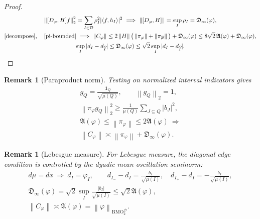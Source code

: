 \documentclass[11pt]{amsart}
\newtheorem{remark}[theorem]{Remark}
\newcommand{\D}{\mathcal D}
\newcommand{\ip}[2]{\langle #1,#2\rangle}
\newcommand{\norm}[1]{\left\|#1\right\|}
\begin{document}
\begin{proof}
\begin{gather*}
 \norm{[D_\varphi,H]f}_2^2
       =\sum_{I\in\D}\rho_I^2|\ip{f}{h_I}|^2
 \ \Longrightarrow\
 \norm{[D_\varphi,H]}=\sup_I\rho_I=\mathfrak D_\infty(\varphi),\\
 \eqref{decompose},\quad\eqref{pi-bounded}
 \ \Longrightarrow\
 \norm{C_\varphi}
  \le2\norm H\big(\norm{\pi_\varphi}+\norm{\pi_{\overline\varphi}}\big)
                       +\mathfrak D_\infty(\varphi)
  \le8\sqrt2\,\mathfrak A(\varphi)+\mathfrak D_\infty(\varphi),\\
 \sup_I|d_I-d_{\widehat I}|\le\mathfrak D_\infty(\varphi)
                    \le\sqrt2\sup_I|d_I-d_{\widehat I}|.
\end{gather*}
\end{proof}

\begin{remark}[Paraproduct norm]
Testing on normalized interval indicators gives
\begin{gather*}
 g_Q=\frac{\mathbf1_Q}{\sqrt{\mu(Q)}},\qquad\norm{g_Q}_2=1,\\
 \norm{\pi_\varphi g_Q}_2^2
       \ge\frac1{\mu(Q)}\sum_{J\subseteq Q}|b_J|^2,\\
 \mathfrak A(\varphi)\le\norm{\pi_\varphi}
                         \le2\mathfrak A(\varphi)
 \ \Longrightarrow\\
 \norm{C_\varphi}\asymp\norm{\pi_\varphi}
                            +\mathfrak D_\infty(\varphi).
\end{gather*}
\end{remark}

\begin{remark}[Lebesgue measure]
For Lebesgue measure, the diagonal edge condition is controlled by
the dyadic mean-oscillation seminorm:
\begin{gather*}
 d\mu=dx\ \Longrightarrow\
 d_I=\varphi_I,\qquad
 d_{I_-}-d_I=\frac{b_I}{\sqrt{\mu(I)}},\quad
 d_{I_+}-d_I=-\frac{b_I}{\sqrt{\mu(I)}},\\
 \mathfrak D_\infty(\varphi)
     =\sqrt2\sup_I\frac{|b_I|}{\sqrt{\mu(I)}}
     \le\sqrt2\mathfrak A(\varphi),\\
 \norm{C_\varphi}\asymp\mathfrak A(\varphi)
                  =\norm{\varphi}_{\mathrm{BMO}_2^{\D}}.
\end{gather*}
\end{remark}
\end{document}
